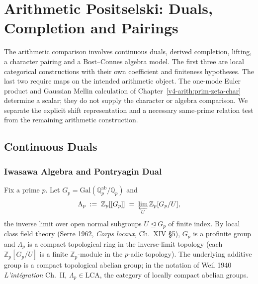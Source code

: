 \chapter{Arithmetic Positselski: Duals, Completion and Pairings}
\label{v4-arith:w5-d:chapter}

The arithmetic comparison involves continuous duals, derived completion,
lifting, a character pairing and a Bost--Connes algebra model. The first
three are local categorical constructions with their own coefficient
and finiteness hypotheses. The last two require maps on the intended
arithmetic object. The one-mode Euler product and Gaussian Mellin
calculation of Chapter~\ref{v4-arith:prim-zeta-char} determine a scalar;
they do not supply the character or algebra comparison. We separate the
explicit shift representation and a necessary same-prime relation test
from the remaining arithmetic construction.

\section{Continuous Duals}
\label{v4-arith:w5-d:sec:continuous-duals}

\subsection{Iwasawa Algebra and Pontryagin Dual}
\label{v4-arith:w5-d:cts-dual:iwasawa}

Fix a prime \(p\). Let \(G_{p}=\mathrm{Gal}(\mathbb{Q}_{p}^{\mathrm{ab}}/\mathbb{Q}_{p})\)
and
\begin{equation}
\label{v4-arith:w5-d:eq:iwasawa-def}
\Lambda_{p}\;:=\;\mathbb{Z}_{p}[[G_{p}]]\;=\;\varprojlim_{U}\mathbb{Z}_{p}[G_{p}/U],
\end{equation}
the inverse limit over open normal subgroups \(U\trianglelefteq G_{p}\)
of finite index. By local class field theory (Serre 1962,
\emph{Corps locaux}, Ch.~XIV \S5), \(G_{p}\) is a profinite group and
\(\Lambda_{p}\) is a compact topological ring in the inverse-limit
topology (each \(\mathbb{Z}_{p}[G_{p}/U]\) is a finite \(\mathbb{Z}_{p}\)-module
in the \(p\)-adic topology). The underlying additive group is a compact
topological abelian group; in the notation of Weil 1940 \emph{L'int\'egration}
Ch.~II, \(\Lambda_{p}\in\mathrm{LCA}\), the category of locally compact
abelian groups.

